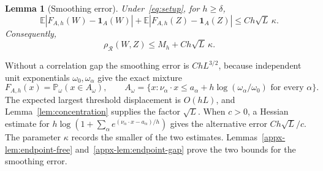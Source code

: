 \documentclass[11pt,letterpaper]{article}
\newif\ifshowrev
\newcommand{\rev}[1]{\ifshowrev{\color{revblue}%
\hypersetup{linkcolor=revblue,citecolor=revblue,urlcolor=revblue}#1}\else#1\fi}
\newcommand{\rs}[1]{\ifshowrev{\color{revblue}#1}\else#1\fi}
\newif\ifshowtrim
\newcommand{\trs}[1]{\ifshowtrim{\color{revblue}#1}\else#1\fi}
\newif\ifshowlin
\newcommand{\lin}[1]{\ifshowlin{\color{revblue}%
\hypersetup{linkcolor=revblue,citecolor=revblue,urlcolor=revblue}#1}\else#1\fi}
\newtheorem{lemma}{Lemma}
\theoremstyle{remark}
\newcommand{\E}{\mathbb E}
\newcommand{\Pp}{\mathbb P}
\newcommand{\rh}{\rho_{\mathcal R}}
\newcommand{\ind}{\mathbf 1}
\begin{document}
\begin{lemma}[Smoothing error]\label{lem:endpoint}
Under~\eqref{eq:setup}, for \(h\ge\delta\),
\begin{equation}
 \E|F_{A,h}(W)-\ind_A(W)|+
 \E|F_{A,h}(Z)-\ind_A(Z)|\le Ch\sqrt L\,\kappa.
 \label{eq:endpoint-error}
\end{equation}
Consequently,
\begin{equation}
 \rh(W,Z)\le M_h+Ch\sqrt L\,\kappa.
 \label{eq:endpoint-min}
\end{equation}
\end{lemma}
\rev{Without a correlation gap the smoothing error is \(ChL^{3/2}\),
because independent unit
exponentials \(\rs{\omega_0},\rs{\omega_\alpha}\) give the exact mixture}
\begin{equation}
 F_{A,h}(x)=\Pp_{\rs\omega}\trs{(x\in A_{\rs\omega}),\qquad
 A_{\rs\omega}=\{x:}\nu_\alpha\cdot x\le
 a_\alpha+h\log(\rs{\omega_\alpha}/\rs{\omega_0})\text{ for every }\alpha\}.
 \label{eq:mixture}
\end{equation}
The expected largest threshold displacement is \(O(hL)\), and
Lemma~\ref{lem:concentration} supplies the factor \(\sqrt L\).
When \(c>0\), a Hessian estimate for
\(h\log(1+\sum_\alpha e^{(\nu_\alpha\cdot x-a_\alpha)/h})\)
gives the alternative error \(Ch\sqrt L/c\). \rev{The parameter \(\kappa\) records the smaller of the two
estimates.} Lemmas~\ref{appx-lem:endpoint-free}
and~\ref{appx-lem:endpoint-gap} prove the two bounds \lin{for the
smoothing error}.
\end{document}
